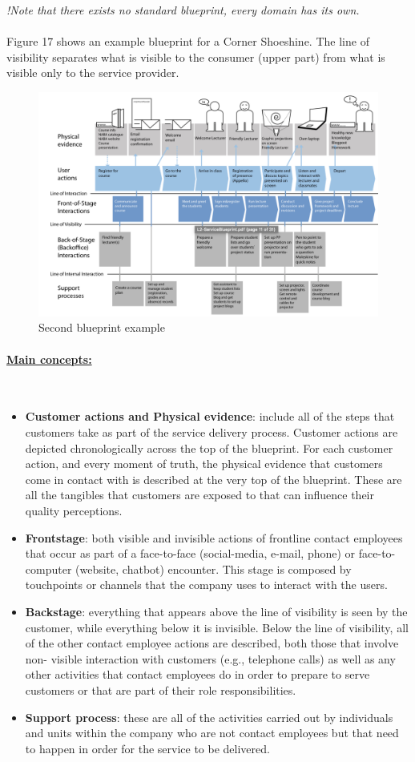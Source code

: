 \documentclass[10pt,a4paper]{article}
\newcommand{\myparagraph}[1]{\paragraph{\uline{#1}}\mbox{}\\[0.05in]}
\begin{document}
\textit{!Note that there exists no standard blueprint, every domain has its own.} 
\\ \\
Figure 17 shows an example blueprint for a Corner Shoeshine. The line of visibility separates what is visible to the consumer (upper part) from what is visible only to the service provider.
\begin{figure}[ht!]
 \hfill \includegraphics[width=400pt]{images/second-service-blueprint}\hspace*{\fill}
 \caption{Second blueprint example}
  \label{fig:second-blueprint}
\end{figure}
\myparagraph{Main concepts:}
\begin{itemize}
	\item \textbf{Customer actions and Physical evidence}: include all of the steps that customers take as part of the service delivery process. Customer actions are depicted chronologically across the top of the blueprint. For each customer action, and every moment of truth, the physical evidence that customers come in contact with is described at the very top of the blueprint. These are all the tangibles that customers are exposed to that can influence their quality perceptions.
	\item \textbf{Frontstage}: both visible and invisible actions of frontline contact employees that occur as part of a face-to-face (social-media, e-mail, phone) or face-to-computer (website, chatbot) encounter. This stage is composed by touchpoints or channels that the company uses to interact with the users.
	\item \textbf{Backstage}: everything that appears above the line of visibility is seen by the customer, while everything below it is invisible. Below the line of visibility, all of the other contact employee actions are described, both those that involve non- visible interaction with customers (e.g., telephone calls) as well as any other activities that contact employees do in order to prepare to serve customers or that are part of their role responsibilities.
	\item \textbf{Support process}: these are all of the activities carried out by individuals and units within the company who are not contact employees but that need to happen in order for the service to be delivered.
\end{itemize}
\end{document}
